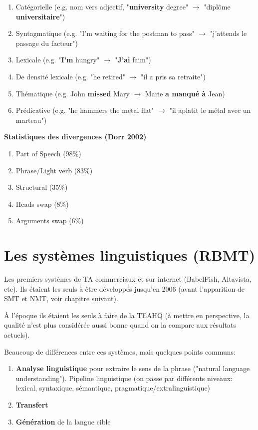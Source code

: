 \begin{enumerate}
    \item Catégorielle (e.g. nom vers adjectif, "\textbf{university} degree" $\rightarrow$ "diplôme \textbf{universitaire}")
    \item Syntagmatique (e.g. "I'm waiting for the postman to pass" $\rightarrow$ "j'attends le passage du facteur")
    \item Lexicale (e.g. "\textbf{I'm} hungry" $\rightarrow$ "\textbf{J'ai} faim")
    \item De densité lexicale (e.g. "he retired" $\rightarrow$ "il a pris sa retraite")
    \item Thématique (e.g. John \textbf{missed} Mary $\rightarrow$ Marie \textbf{a manqué à} Jean)
    \item Prédicative (e.g. "he hammers the metal flat" $\rightarrow$ "il aplatit le métal avec un marteau")\\
\end{enumerate}

\noindent\textbf{Statistiques des divergences (Dorr 2002)\\}

\begin{enumerate}
    \item Part of Speech (98\%)
    \item Phrase/Light verb (83\%)
    \item Structural (35\%)
    \item Heads swap (8\%)
    \item Arguments swap (6\%)
\end{enumerate}

\newpage

\section{Les systèmes linguistiques (RBMT)}
\label{sec:RBMT}

Les premiers systèmes de TA commerciaux et sur internet (BabelFish, Altavista, etc).
Ils étaient les seuls à être développés jusqu'en 2006 (avant l'apparition de SMT et NMT, voir chapitre suivant).

À l'époque ils étaient les seuls à faire de la TEAHQ (à mettre en perspective, la qualité n'est plus considérée aussi bonne quand on la compare aux résultats actuels).

Beaucoup de différences entre ces systèmes, mais quelques points communs:

\begin{enumerate}
    \item \textbf{Analyse linguistique} pour extraire le sens de la phrase
    ("natural language understanding"). Pipeline linguistique (on passe par différents niveaux: lexical,
        syntaxique, sémantique, pragmatique/extralinguistique)
    \item \textbf{Transfert}
    \item \textbf{Génération} de la langue cible\\
\end{enumerate}

